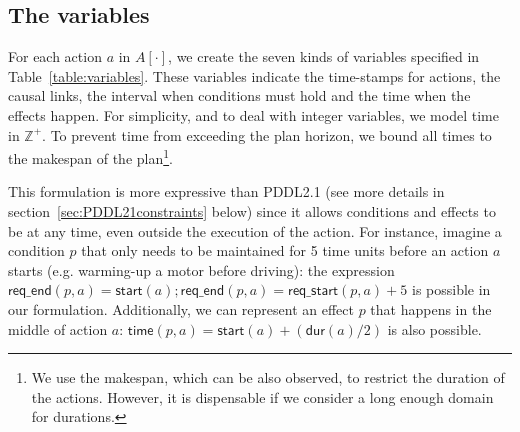 \documentclass[runningheads]{llncs}
\newcommand{\dur}{\mathsf{dur}}    %
\newcommand{\start}{\mathsf{start}}%
\newcommand{\tim}{\mathsf{time}}   %
\newcommand{\reqs}{\mathsf{req\_{start}}} %
\newcommand{\reqe}{\mathsf{req\_{end}}}   %
\begin{document}
\subsection{The variables}
For each action $a$ in $A[\cdot]$, we create the seven kinds of variables specified in Table~\ref{table:variables}. These variables indicate the time-stamps for actions, the causal links, the interval when conditions must hold and the time when the effects happen. For simplicity, and to deal with integer variables, we model time in $\mathbb{Z}^+$. To prevent time from exceeding the plan horizon, we bound all times to the makespan of the plan\footnote{We use the makespan, which can be also observed, to restrict the duration of the actions. However, it is dispensable if we consider a long enough domain for durations.}.


This formulation is more expressive than PDDL2.1 (see more details in section~\ref{sec:PDDL21constraints} below) since it allows conditions and effects to be at any time, even outside the execution of the action. For instance, imagine a condition $p$ that only needs to be maintained for 5 time units before an action $a$ starts (e.g. warming-up a motor before driving): the expression $\reqe(p,a)=\start(a); \reqe(p,a) = \reqs(p,a)+5$ is possible in our formulation. Additionally, we can represent an effect $p$ that happens in the middle of action $a$: $\tim(p,a) = \start(a)+ (\dur(a) / 2)$ is also possible.
\end{document}
